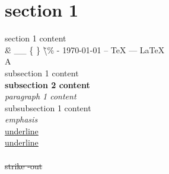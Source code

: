 \documentclass[10pt,a4paper,notitlepage,onecolumn]{article}
\begin{document}
        \section{section 1}
             section 1 content 
             \\ %
             \newline   %
             \^ \& \_\_ \{ \} \~ \textbackslash \% 
             -  %
              \today 
              --    %
               \TeX 
               ---  %
                \LaTeX \\
            \textcircled{A} 
            \\
            \tiny   %
            \textrm{subsection 1 content}\\ %
            \small
            \textbf{subsection 2 content}\\   %
            \Large
            \textit{paragraph 1 content}\\    %
            \textsf{subsubsection 1 content}\\    %
            \emph{emphasis}\\
            \uline{underline}\\
            \underline{underline}\\ %
            \\
            \sout{strike -out}\\
\end{document}

